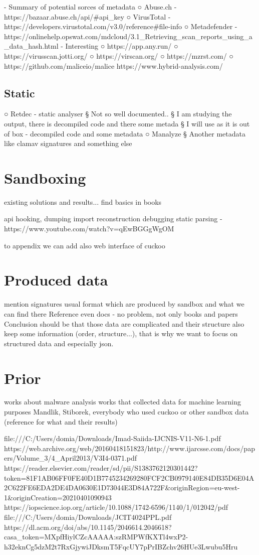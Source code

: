 - Summary of potential sorces of metadata
○ Abuse.ch - https://bazaar.abuse.ch/api/#api_key
○ VirusTotal - https://developers.virustotal.com/v3.0/reference#file-info
○ Metadefender - https://onlinehelp.opswat.com/mdcloud/3.1_Retrieving_scan_reports_using_a_data_hash.html
- Interesting
○ https://app.any.run/
○ https://virusscan.jotti.org/
○ https://virscan.org/
○ https://mzrst.com/
○ https://github.com/maliceio/malice
https://www.hybrid-analysis.com/

\subsection{Static}
○ Retdec - static analyser
§ Not so well documented..
§ I am studying the output, there is decompiled code and there some metada
§ I will use as it is out of box - decompiled code and some metadata
○ Manalyze
§ Another metadata like clamav signatures and something else


\section{Sandboxing}
existing solutions and results...
find basics in books

api hooking, dumping import reconstruction debugging static parsing - https://www.youtube.com/watch?v=qEwBGGgWgOM

to appendix we can add also web interface of cuckoo


\section{Produced data}
mention signatures
usual format which are produced by sandbox and what we can find there
Reference even docs - no problem, not only books and papers
Conclusion should be that those data are complicated and their structure also keep some information (order, structure...), that is why we want to focus on structured data and especially json.


\section{Prior}
works about malware analysis
works that collected data for machine learning purposes
Mandlik, Stiborek, everybody who used cuckoo or other sandbox data (reference for what and their results)

file:///C:/Users/domia/Downloads/Imad-Saiida-IJCNIS-V11-N6-1.pdf
https://web.archive.org/web/20160418151823/http://www.ijarcsse.com/docs/papers/Volume_3/4_April2013/V3I4-0371.pdf
https://reader.elsevier.com/reader/sd/pii/S1383762120301442?token=81F1AB06FF0FE40D1B7745234269280FCF2CB0979140E84DB35D6E04A2C622FE6EDA2DE4DA0630E1D73044E3D84A722F&originRegion=eu-west-1&originCreation=20210401090943
https://iopscience.iop.org/article/10.1088/1742-6596/1140/1/012042/pdf
file:///C:/Users/domia/Downloads/JCIT4024PPL.pdf
https://dl.acm.org/doi/abs/10.1145/2046614.2046618?casa_token=MXpfHiylCZcAAAAA:szRMPWfKXTl4wxP2-h32eknCg5dzM2t7RxGjywiJDksmT5FqcUY7pPrIBZchv26HUe3Lwubu5Hru

